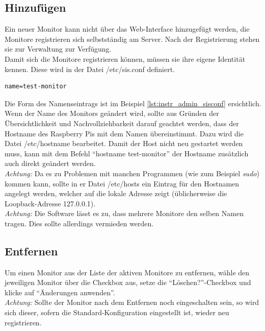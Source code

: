 \subsection{Hinzufügen}

Ein neuer Monitor kann nicht über das Web-Interface hinzugefügt werden, die Monitore registrieren sich selbstständig am Server. Nach der Registrierung stehen sie zur Verwaltung zur Verfügung.\\
Damit sich die Monitore registrieren können, müssen sie ihre eigene Identität kennen. Diese wird in der Datei /etc/sis.conf definiert.\\

\begin{lstlisting}[style=custom,  caption={/etc/sis.conf},label={lst:instr_admin_sisconf}]
name=test-monitor
\end{lstlisting}
Die Form des Namenseintrags ist im Beispiel  \autoref{lst:instr_admin_sisconf} ersichtlich.\\
Wenn der Name des Monitors geändert wird, sollte aus Gründen der Übersichtlichkeit und Nachvollziehbarkeit darauf geachtet werden, dass der Hostname des Raspberry Pis mit dem Namen übereinstimmt. Dazu wird die Datei /etc/hostname bearbeitet. Damit der Host nicht neu gestartet werden muss, kann mit dem Befehl \enquote{hostname test-monitor} der Hostname zusätzlich auch direkt geändert werden.\\
\textit{Achtung:} Da es zu Problemen mit manchen Programmen (wie zum Beispiel \textit{sudo}) kommen kann, sollte in er Datei /etc/hosts ein Eintrag für den Hostnamen angelegt werden, welcher auf die lokale Adresse zeigt (üblicherweise die Loopback-Adresse 127.0.0.1).\\
\textit{Achtung:} Die Software lässt es zu, dass mehrere Monitore den selben Namen tragen. Dies sollte allerdings vermieden werden.

\subsection{Entfernen}

Um einen Monitor aus der Liste der aktiven Monitore zu entfernen, wähle den jeweiligen Monitor über die Checkbox aus, setze die \enquote{Löschen?}-Checkbox und klicke auf \enquote{Änderungen anwenden}.\\
\textit{Achtung:} Sollte der Monitor nach dem Entfernen noch eingeschalten sein, so wird sich dieser, sofern die Standard-Konfiguration eingestellt ist, wieder neu registrieren.

